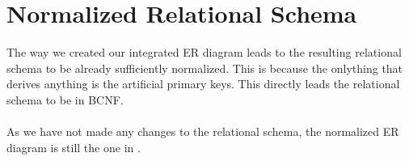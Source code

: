 \section{Normalized Relational Schema}

The way we created our integrated ER diagram leads to the resulting relational schema to be already sufficiently normalized. This is because the onlything that derives anything is the artificial primary keys. This directly leads the relational schema to be in BCNF.\\\\
As we have not made any changes to the relational schema, the normalized ER diagram is still the one in .